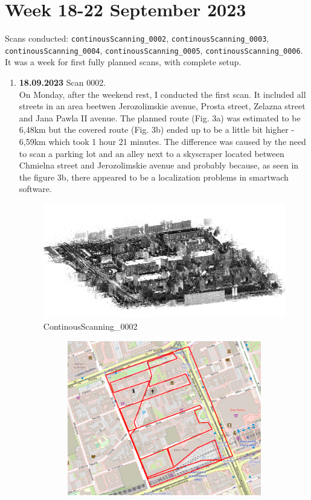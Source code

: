 \documentclass[a4paper,12pt]{book}
\begin{document}
\section{Week 18-22 September 2023}
Scans conducted: \verb|continousScanning_0002|, \verb|continousScanning_0003|, \verb|continousScanning_0004|, \verb|continousScanning_0005|, \verb|continousScanning_0006|.\\
It was a week for first fully planned scans, with complete setup. 
\begin{enumerate}
	\item \textbf{18.09.2023} Scan 0002. \\
	On Monday, after the weekend rest, I conducted the first scan. It included all streets in an area beetwen Jerozolimskie avenue, Prosta street, Zelazna street and Jana Pawla II avenue. The planned route (Fig. 3a) was estimated to be 6,48km but the covered route (Fig. 3b) ended up to be a little bit higher - 6,59km which took 1 hour 21 minutes. The difference was caused by the need to scan a parking lot and an alley next to a skyscraper located between Chmielna street and Jerozolimskie avenue and probably because, as seen in the figure 3b, there appeared to be a localization problems in smartwach software.
	\begin{figure}[H]
		\includegraphics[width=1\linewidth]{cloud2}
		\caption{ContinousScanning\_0002}
	\end{figure}
	\begin{figure}[H]
		\centering
		\begin{subfigure}{.90\textwidth}
			\centering
			\includegraphics[width=1\linewidth]{route_p2}

\end{subfigure}
\end{figure}
\end{enumerate}
\end{document}
